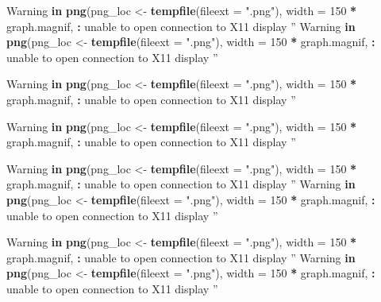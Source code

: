\documentclass[
]{book}
\newenvironment{Shaded}{\begin{snugshade}}{\end{snugshade}}
\newcommand{\ControlFlowTok}[1]{\textcolor[rgb]{0.13,0.29,0.53}{\textbf{#1}}}
\newcommand{\DataTypeTok}[1]{\textcolor[rgb]{0.13,0.29,0.53}{#1}}
\newcommand{\DecValTok}[1]{\textcolor[rgb]{0.00,0.00,0.81}{#1}}
\newcommand{\KeywordTok}[1]{\textcolor[rgb]{0.13,0.29,0.53}{\textbf{#1}}}
\newcommand{\NormalTok}[1]{#1}
\newcommand{\OperatorTok}[1]{\textcolor[rgb]{0.81,0.36,0.00}{\textbf{#1}}}
\newcommand{\StringTok}[1]{\textcolor[rgb]{0.31,0.60,0.02}{#1}}
\begin{document}
\begin{Shaded}
\begin{Highlighting}[]
\NormalTok{Warning }\ControlFlowTok{in} \KeywordTok{png}\NormalTok{(png_loc <-}\StringTok{ }\KeywordTok{tempfile}\NormalTok{(}\DataTypeTok{fileext =} \StringTok{".png"}\NormalTok{), }\DataTypeTok{width =} \DecValTok{150} \OperatorTok{*}
\NormalTok{graph.magnif, }\OperatorTok{:}\StringTok{ }\NormalTok{unable to open connection to X11 display }\StringTok{''}
\NormalTok{Warning }\ControlFlowTok{in} \KeywordTok{png}\NormalTok{(png_loc <-}\StringTok{ }\KeywordTok{tempfile}\NormalTok{(}\DataTypeTok{fileext =} \StringTok{".png"}\NormalTok{), }\DataTypeTok{width =} \DecValTok{150} \OperatorTok{*}
\NormalTok{graph.magnif, }\OperatorTok{:}\StringTok{ }\NormalTok{unable to open connection to X11 display }\StringTok{''}

\NormalTok{Warning }\ControlFlowTok{in} \KeywordTok{png}\NormalTok{(png_loc <-}\StringTok{ }\KeywordTok{tempfile}\NormalTok{(}\DataTypeTok{fileext =} \StringTok{".png"}\NormalTok{), }\DataTypeTok{width =} \DecValTok{150} \OperatorTok{*}
\NormalTok{graph.magnif, }\OperatorTok{:}\StringTok{ }\NormalTok{unable to open connection to X11 display }\StringTok{''}

\NormalTok{Warning }\ControlFlowTok{in} \KeywordTok{png}\NormalTok{(png_loc <-}\StringTok{ }\KeywordTok{tempfile}\NormalTok{(}\DataTypeTok{fileext =} \StringTok{".png"}\NormalTok{), }\DataTypeTok{width =} \DecValTok{150} \OperatorTok{*}
\NormalTok{graph.magnif, }\OperatorTok{:}\StringTok{ }\NormalTok{unable to open connection to X11 display }\StringTok{''}

\NormalTok{Warning }\ControlFlowTok{in} \KeywordTok{png}\NormalTok{(png_loc <-}\StringTok{ }\KeywordTok{tempfile}\NormalTok{(}\DataTypeTok{fileext =} \StringTok{".png"}\NormalTok{), }\DataTypeTok{width =} \DecValTok{150} \OperatorTok{*}
\NormalTok{graph.magnif, }\OperatorTok{:}\StringTok{ }\NormalTok{unable to open connection to X11 display }\StringTok{''}
\NormalTok{Warning }\ControlFlowTok{in} \KeywordTok{png}\NormalTok{(png_loc <-}\StringTok{ }\KeywordTok{tempfile}\NormalTok{(}\DataTypeTok{fileext =} \StringTok{".png"}\NormalTok{), }\DataTypeTok{width =} \DecValTok{150} \OperatorTok{*}
\NormalTok{graph.magnif, }\OperatorTok{:}\StringTok{ }\NormalTok{unable to open connection to X11 display }\StringTok{''}

\NormalTok{Warning }\ControlFlowTok{in} \KeywordTok{png}\NormalTok{(png_loc <-}\StringTok{ }\KeywordTok{tempfile}\NormalTok{(}\DataTypeTok{fileext =} \StringTok{".png"}\NormalTok{), }\DataTypeTok{width =} \DecValTok{150} \OperatorTok{*}
\NormalTok{graph.magnif, }\OperatorTok{:}\StringTok{ }\NormalTok{unable to open connection to X11 display }\StringTok{''}
\NormalTok{Warning }\ControlFlowTok{in} \KeywordTok{png}\NormalTok{(png_loc <-}\StringTok{ }\KeywordTok{tempfile}\NormalTok{(}\DataTypeTok{fileext =} \StringTok{".png"}\NormalTok{), }\DataTypeTok{width =} \DecValTok{150} \OperatorTok{*}
\NormalTok{graph.magnif, }\OperatorTok{:}\StringTok{ }\NormalTok{unable to open connection to X11 display }\StringTok{''}


\end{Highlighting}
\end{Shaded}
\end{document}
